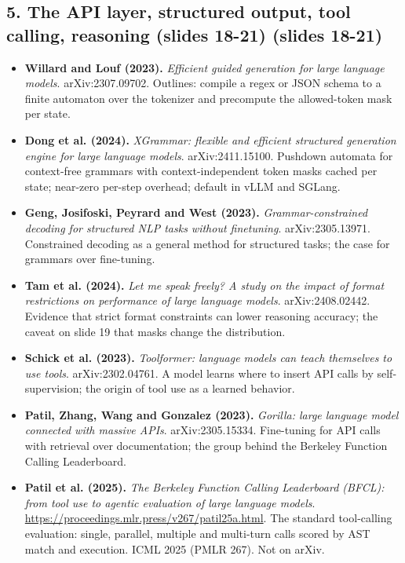 \documentclass[11pt,letterpaper]{article}
\begin{document}
\subsection*{5. The API layer, structured output, tool calling, reasoning (slides 18-21) (slides 18-21)}
\begin{itemize}[leftmargin=1.2em,itemsep=3pt]\sloppy
\item \textbf{Willard and Louf (2023).} \textit{Efficient guided generation for large language models}. arXiv:2307.09702. Outlines: compile a regex or JSON schema to a finite automaton over the tokenizer and precompute the allowed-token mask per state.
\item \textbf{Dong et al. (2024).} \textit{XGrammar: flexible and efficient structured generation engine for large language models}. arXiv:2411.15100. Pushdown automata for context-free grammars with context-independent token masks cached per state; near-zero per-step overhead; default in vLLM and SGLang.
\item \textbf{Geng, Josifoski, Peyrard and West (2023).} \textit{Grammar-constrained decoding for structured NLP tasks without finetuning}. arXiv:2305.13971. Constrained decoding as a general method for structured tasks; the case for grammars over fine-tuning.
\item \textbf{Tam et al. (2024).} \textit{Let me speak freely? A study on the impact of format restrictions on performance of large language models}. arXiv:2408.02442. Evidence that strict format constraints can lower reasoning accuracy; the caveat on slide 19 that masks change the distribution.
\item \textbf{Schick et al. (2023).} \textit{Toolformer: language models can teach themselves to use tools}. arXiv:2302.04761. A model learns where to insert API calls by self-supervision; the origin of tool use as a learned behavior.
\item \textbf{Patil, Zhang, Wang and Gonzalez (2023).} \textit{Gorilla: large language model connected with massive APIs}. arXiv:2305.15334. Fine-tuning for API calls with retrieval over documentation; the group behind the Berkeley Function Calling Leaderboard.
\item \textbf{Patil et al. (2025).} \textit{The Berkeley Function Calling Leaderboard (BFCL): from tool use to agentic evaluation of large language models}. \url{https://proceedings.mlr.press/v267/patil25a.html}. The standard tool-calling evaluation: single, parallel, multiple and multi-turn calls scored by AST match and execution. ICML 2025 (PMLR 267). Not on arXiv.

\end{itemize}
\end{document}
